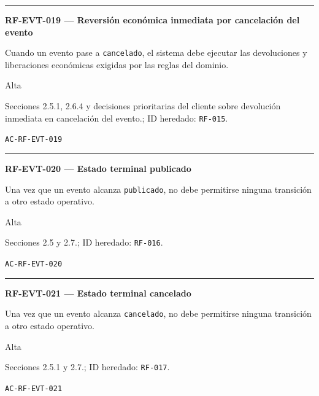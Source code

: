 \documentclass[10pt,letterpaper]{article}
\begin{document}
\vspace{0.25em}\hrule\vspace{0.65em}
\noindent\textbf{RF-EVT-019 --- Reversión económica inmediata por cancelación del evento}\par
\begin{description}[style=nextline,leftmargin=3.15cm,labelwidth=2.8cm,font=\normalfont\bfseries]
\item[Obligación] Cuando un evento pase a \texttt{cancelado}, el sistema debe ejecutar las devoluciones y liberaciones económicas exigidas por las reglas del dominio.
\item[Prioridad] Alta
\item[Procedencia] Secciones 2.5.1, 2.6.4 y decisiones prioritarias del cliente sobre devolución inmediata en cancelación del evento.; ID heredado: \texttt{RF-015}.
\item[Verificación] \texttt{AC-RF-EVT-019}
\end{description}
\vspace{0.25em}\hrule\vspace{0.65em}
\noindent\textbf{RF-EVT-020 --- Estado terminal publicado}\par
\begin{description}[style=nextline,leftmargin=3.15cm,labelwidth=2.8cm,font=\normalfont\bfseries]
\item[Obligación] Una vez que un evento alcanza \texttt{publicado}, no debe permitirse ninguna transición a otro estado operativo.
\item[Prioridad] Alta
\item[Procedencia] Secciones 2.5 y 2.7.; ID heredado: \texttt{RF-016}.
\item[Verificación] \texttt{AC-RF-EVT-020}
\end{description}
\vspace{0.25em}\hrule\vspace{0.65em}
\noindent\textbf{RF-EVT-021 --- Estado terminal cancelado}\par
\begin{description}[style=nextline,leftmargin=3.15cm,labelwidth=2.8cm,font=\normalfont\bfseries]
\item[Obligación] Una vez que un evento alcanza \texttt{cancelado}, no debe permitirse ninguna transición a otro estado operativo.
\item[Prioridad] Alta
\item[Procedencia] Secciones 2.5.1 y 2.7.; ID heredado: \texttt{RF-017}.
\item[Verificación] \texttt{AC-RF-EVT-021}
\end{description}
\end{document}
